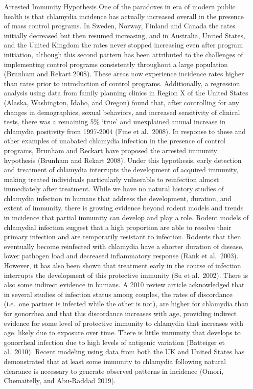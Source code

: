 \documentclass [11pt, proquest] {uwthesis}[2015/03/03]
\begin{document}
Arrested Immunity Hypothesis
One of the paradoxes in era of modern public health is that chlamydia incidence has actually increased overall in the presence of mass control programs. In Sweden, Norway, Finland and Canada the rates initially decreased but then resumed increasing, and in Australia, United States, and the United Kingdom the rates never stopped increasing even after program initiation, although this second pattern has been attributed to the challenges of implementing control programs consistently throughout a large population (Brunham and Rekart 2008). These areas now experience incidence rates higher than rates prior to introduction of control programs. Additionally, a regression analysis using data from family planning clinics in Region X of the United States (Alaska, Washington, Idaho, and Oregon) found that, after controlling for any changes in demographics, sexual behaviors, and increased sensitivity of clinical tests, there was a remaining 5\% `true' and unexplained annual increase in chlamydia positivity from 1997-2004 (Fine et al.~2008). In response to these and other examples of unabated chlamydia infection in the presence of control programs, Brunham and Reckart have proposed the arrested immunity hypothesis (Brunham and Rekart 2008). Under this hypothesis, early detection and treatment of chlamydia interrupts the development of acquired immunity, making treated individuals particularly vulnerable to reinfection almost immediately after treatment.
While we have no natural history studies of chlamydia infection in humans that address the development, duration, and extent of immunity, there is growing evidence beyond rodent models and trends in incidence that partial immunity can develop and play a role. Rodent models of chlamydial infection suggest that a high proportion are able to resolve their primary infection and are temporarily resistant to infection. Rodents that then eventually become reinfected with chlamydia have a shorter duration of disease, lower pathogen load and decreased inflammatory response (Rank et al.~2003). However, it has also been shown that treatment early in the course of infection interrupts the development of this protective immunity (Su et al.~2002).
There is also some indirect evidence in humans. A 2010 review article acknowledged that in several studies of infection status among couples, the rates of discordance (i.e.~one partner is infected while the other is not), are higher for chlamydia than for gonorrhea and that this discordance increases with age, providing indirect evidence for some level of protective immunity to chlamydia that increases with age, likely due to exposure over time. There is little immunity that develops to gonorrheal infection due to high levels of antigenic variation (Batteiger et al.~2010). Recent modeling using data from both the UK and United States has demonstrated that at least some immunity to chlamydia following natural clearance is necessary to generate observed patterns in incidence (Omori, Chemaitelly, and Abu-Raddad 2019).
\end{document}
